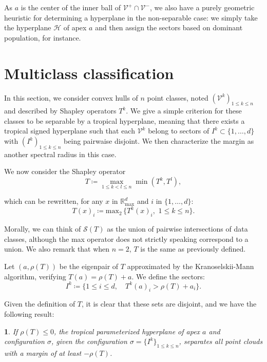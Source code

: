 \documentclass[oneside,UKenglish,a4paper]{amsart}
\numberwithin{equation}{section}
\numberwithin{figure}{section}
\theoremstyle{plain}
\theoremstyle{definition}
\theoremstyle{plain}
\newtheorem{prop}[thm]{\protect\propositionname}
\theoremstyle{remark}
\theoremstyle{plain}
\theoremstyle{definition}
\theoremstyle{definition}
\providecommand{\propositionname}{Proposition}
\begin{document}
As $a$ is the center of the inner ball of $\mathcal{V}^{+}\cap\mathcal{V}^{-}$,
we also have a purely geometric heuristic for determining a
hyperplane in the non-separable case: we simply take the hyperplane
$\mathcal{H}$ of apex $a$ and then assign the sectors based on dominant
population, for instance.


\section{Multiclass classification}

In this section, we consider convex hulls of $n$
point classes, noted $(\mathcal{V}^{k})_{1\le k\le n}$ and described by Shapley operators
$T^{k}$. We give a simple criterion for these classes to be separable by a tropical hyperplane, meaning that there exists a tropical signed
hyperplane such that each $\mathcal{V}^{k}$ belong to sectors of $I^{k}\subset\{1,\ldots, d\}$
with $(I^{k})_{1\le k \le n}$ being pairwaise disjoint. We then characterize the margin as another spectral radius in this case.

We now consider the Shapley operator
\[
T\coloneqq\max_{1\le k<l\le n}\min(T^{k}, T^{l}),
\]

which can be rewritten, for any $x$ in $\mathbb{R}_{\max}^d$ and $i$ in $\{1,\ldots, d\}$:
\[
T(x)_i\coloneqq\text{max}_2\, \{T^k(x)_i, \,\, 1\le k\le n\}.
\]


Morally, we can think of $\mathcal{S}(T)$ as the union of pairwise intersections of data classes, although the max operator does not strictly speaking correspond to a union. We also remark that when $n=2$, $T$ is the same as previously
defined.

Let $(a,\rho(T))$ be the eigenpair of $T$ approximated by the Kranoselskii-Mann
algorithm, verifying $T(a)=\rho(T)+a$. We define the sectors:
\[
I^{k}\coloneqq\{1\le i\le d,\quad T^{k}(a)_{i}>\rho(T)+a_{i}\}.
\]

Given the definition of $T$, it is clear that these sets are disjoint, and we have the following result:
\begin{prop}\label{prop:MultiClass}
If $\rho(T)\le 0$, the tropical parameterized hyperplane of apex $a$ and configuration $\sigma$,
given the configuration $\sigma=\{I^{k}\}_{1\le k\le n}$, separates all point clouds with a margin of at least $-\rho(T)$.

\end{prop}
\end{document}
